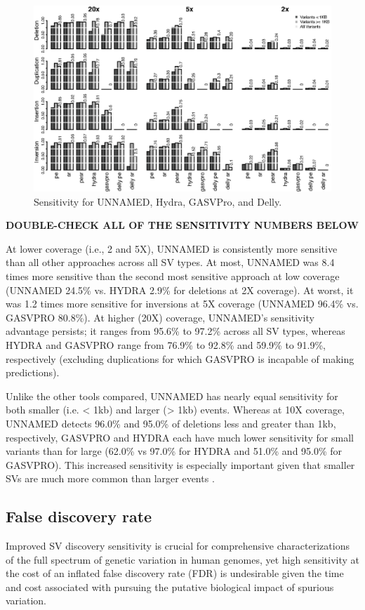 \documentclass[11pt]{article}
\begin{document}
\begin{figure}
\includegraphics[width=6.5in]{R/ss_sl_s-un_hy_gv_dl-r10x.eps}
\caption{Sensitivity for UNNAMED, Hydra, GASVPro, and Delly.}
\label{sensitivity:fig}
\end{figure}

\textbf{DOUBLE-CHECK ALL OF THE SENSITIVITY NUMBERS BELOW}

At lower coverage (i.e., 2 and 5X), UNNAMED is consistently more sensitive 
than all other approaches across all SV types. At most, UNNAMED was 
8.4 times more sensitive than the second most
sensitive approach at low coverage (UNNAMED 24.5\% vs. HYDRA 2.9\% for deletions
at 2X coverage). At worst, it was 1.2 times more sensitive for inversions at
5X coverage (UNNAMED 96.4\% vs. GASVPRO 80.8\%). At higher (20X) coverage, 
UNNAMED's sensitivity advantage persists; it ranges from 95.6\% to 97.2\% 
across all SV types, whereas HYDRA and GASVPRO range from 76.9\% to 92.8\% and
59.9\% to 91.9\%, respectively (excluding duplications for which GASVPRO is
incapable of making predictions).

Unlike the other tools compared, UNNAMED has nearly equal sensitivity for 
both smaller (i.e. < 1kb) and larger (> 1kb) events. Whereas at 10X coverage,
UNNAMED detects 96.0\% and 95.0\% of deletions less and greater than 1kb, 
respectively, GASVPRO and HYDRA each have much lower sensitivity for small
variants than for large (62.0\% vs 97.0\% for HYDRA and 51.0\% and 95.0\% for
GASVPRO). This increased sensitivity is especially important given that smaller
SVs are much more common than larger events \cite{mills2011}.


\subsection{False discovery rate}
Improved SV discovery sensitivity is crucial for comprehensive characterizations
of the full spectrum of genetic variation in human genomes, yet high
sensitivity at the cost of an inflated false discovery rate (FDR) is
undesirable given the time and cost associated with pursuing the putative 
biological impact of spurious variation.
\end{document}
